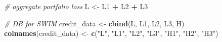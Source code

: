 \documentclass[]{article}
\newenvironment{Shaded}{\begin{snugshade}}{\end{snugshade}}
\newcommand{\CommentTok}[1]{\textcolor[rgb]{0.56,0.35,0.01}{\textit{#1}}}
\newcommand{\KeywordTok}[1]{\textcolor[rgb]{0.13,0.29,0.53}{\textbf{#1}}}
\newcommand{\NormalTok}[1]{#1}
\newcommand{\OperatorTok}[1]{\textcolor[rgb]{0.81,0.36,0.00}{\textbf{#1}}}
\newcommand{\StringTok}[1]{\textcolor[rgb]{0.31,0.60,0.02}{#1}}
\begin{document}
\begin{Shaded}
\begin{Highlighting}[]
\CommentTok{# aggregate portfolio loss}
\NormalTok{  L <-}\StringTok{ }\NormalTok{L1 }\OperatorTok{+}\StringTok{ }\NormalTok{L2 }\OperatorTok{+}\StringTok{ }\NormalTok{L3}
  
\CommentTok{# DB for SWIM}
\NormalTok{  credit_data <-}\StringTok{ }\KeywordTok{cbind}\NormalTok{(L, L1, L2, L3, H)}
  \KeywordTok{colnames}\NormalTok{(credit_data) <-}\StringTok{ }\KeywordTok{c}\NormalTok{(}\StringTok{"L"}\NormalTok{, }\StringTok{"L1"}\NormalTok{, }\StringTok{"L2"}\NormalTok{, }\StringTok{"L3"}\NormalTok{, }\StringTok{"H1"}\NormalTok{, }\StringTok{"H2"}\NormalTok{, }\StringTok{"H3"}\NormalTok{)}
\end{Highlighting}
\end{Shaded}


\end{document}

